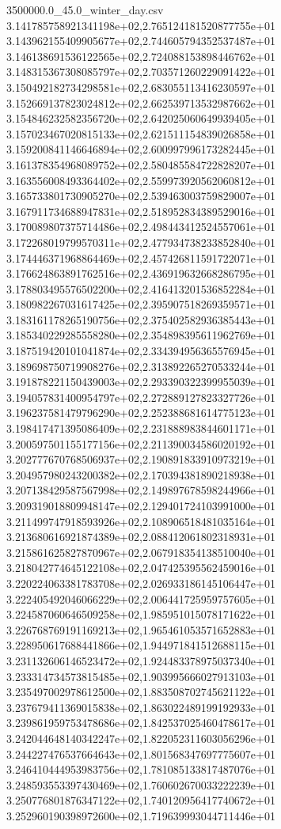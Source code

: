 \begin{filecontents*}{3500000.0_45.0_winter_day.csv}
3.141785758921341198e+02,2.765124181520877755e+01
3.143962155409905677e+02,2.744605794352537487e+01
3.146138691536122565e+02,2.724088153898446762e+01
3.148315367308085797e+02,2.703571260229091422e+01
3.150492182734298581e+02,2.683055113416230597e+01
3.152669137823024812e+02,2.662539713532987662e+01
3.154846232582356720e+02,2.642025060649939405e+01
3.157023467020815133e+02,2.621511154839026858e+01
3.159200841146646894e+02,2.600997996173282445e+01
3.161378354968089752e+02,2.580485584722828207e+01
3.163556008493364402e+02,2.559973920562060812e+01
3.165733801730905270e+02,2.539463003759829007e+01
3.167911734688947831e+02,2.518952834389529016e+01
3.170089807375714486e+02,2.498443412524557061e+01
3.172268019799570311e+02,2.477934738233852840e+01
3.174446371968864469e+02,2.457426811591722071e+01
3.176624863891762516e+02,2.436919632668286795e+01
3.178803495576502200e+02,2.416413201536852284e+01
3.180982267031617425e+02,2.395907518269359571e+01
3.183161178265190756e+02,2.375402582936385443e+01
3.185340229285558280e+02,2.354898395611962769e+01
3.187519420101041874e+02,2.334394956365576945e+01
3.189698750719908276e+02,2.313892265270533244e+01
3.191878221150439003e+02,2.293390322399955039e+01
3.194057831400954797e+02,2.272889127823327726e+01
3.196237581479796290e+02,2.252388681614775123e+01
3.198417471395086409e+02,2.231888983844601171e+01
3.200597501155177156e+02,2.211390034586020192e+01
3.202777670768506937e+02,2.190891833910973219e+01
3.204957980243200382e+02,2.170394381890218938e+01
3.207138429587567998e+02,2.149897678598244966e+01
3.209319018809948147e+02,2.129401724103991000e+01
3.211499747918593926e+02,2.108906518481035164e+01
3.213680616921874389e+02,2.088412061802318931e+01
3.215861625827870967e+02,2.067918354138510040e+01
3.218042774645122108e+02,2.047425395562459016e+01
3.220224063381783708e+02,2.026933186145106447e+01
3.222405492046066229e+02,2.006441725959757605e+01
3.224587060646509258e+02,1.985951015078171622e+01
3.226768769191169213e+02,1.965461053571652883e+01
3.228950617688441866e+02,1.944971841512688115e+01
3.231132606146523472e+02,1.924483378975037340e+01
3.233314734573815485e+02,1.903995666027913103e+01
3.235497002978612500e+02,1.883508702745621122e+01
3.237679411369015838e+02,1.863022489199192933e+01
3.239861959753478686e+02,1.842537025460478617e+01
3.242044648140342247e+02,1.822052311603056296e+01
3.244227476537664643e+02,1.801568347697775607e+01
3.246410444953983756e+02,1.781085133817487076e+01
3.248593553397430469e+02,1.760602670033222239e+01
3.250776801876347122e+02,1.740120956417740672e+01
3.252960190398972600e+02,1.719639993044711446e+01

\end{filecontents*}
